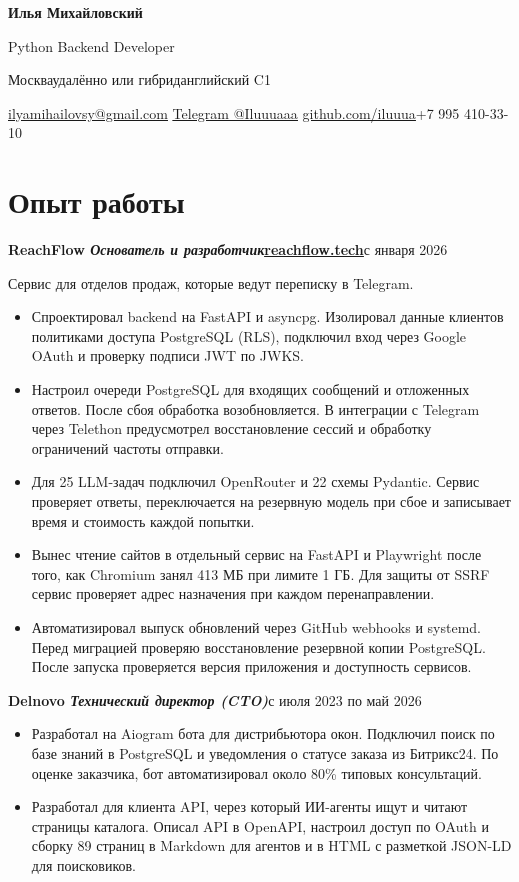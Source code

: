 \documentclass[10pt,a4paper]{article}
\newcommand{\role}[2]{\textbf{#1}\hfill{\small #2}\par}
\newcommand{\sep}{\enspace\textbar\enspace}
\begin{document}
\fontsize{10.3}{12.2}\selectfont
{\centering
  {\fontsize{23}{26}\selectfont\bfseries Илья Михайловский}\par
  \vspace{1.5pt}
  {\large Python Backend Developer}\par
  \vspace{2pt}
  Москва\sep удалённо или гибрид\sep английский C1\par
  \href{mailto:ilyamihailovsy@gmail.com}{\underline{ilyamihailovsy@gmail.com}}\sep
  \href{https://t.me/Iluuuaaa}{\underline{Telegram @Iluuuaaa}}\sep
  \href{https://github.com/iluuua}{\underline{github.com/iluuua}}\sep +7 995 410-33-10\par
}

\section{Опыт работы}
\role{ReachFlow \normalfont\textit{Основатель и разработчик}\enspace\href{https://reachflow.tech}{\underline{reachflow.tech}}}{с января 2026}
Сервис для отделов продаж, которые ведут переписку в Telegram.
\begin{itemize}
  \item Спроектировал backend на FastAPI и asyncpg. Изолировал данные клиентов политиками доступа PostgreSQL (RLS), подключил вход через Google OAuth и проверку подписи JWT по JWKS.
  \item Настроил очереди PostgreSQL для входящих сообщений и отложенных ответов. После сбоя обработка возобновляется. В интеграции с Telegram через Telethon предусмотрел восстановление сессий и обработку ограничений частоты отправки.
  \item Для 25 LLM-задач подключил OpenRouter и 22 схемы Pydantic. Сервис проверяет ответы, переключается на резервную модель при сбое и записывает время и стоимость каждой попытки.
  \item Вынес чтение сайтов в отдельный сервис на FastAPI и Playwright после того, как Chromium занял 413 МБ при лимите 1 ГБ. Для защиты от SSRF сервис проверяет адрес назначения при каждом перенаправлении.
  \item Автоматизировал выпуск обновлений через GitHub webhooks и systemd. Перед миграцией проверяю восстановление резервной копии PostgreSQL. После запуска проверяется версия приложения и доступность сервисов.
\end{itemize}

\vspace{3pt}
\role{Delnovo \normalfont\textit{Технический директор (CTO)}}{с июля 2023 по май 2026}
\begin{itemize}
  \item Разработал на Aiogram бота для дистрибьютора окон. Подключил поиск по базе знаний в PostgreSQL и уведомления о статусе заказа из Битрикс24. По оценке заказчика, бот автоматизировал около 80\% типовых консультаций.
  \item Разработал для клиента API, через который ИИ-агенты ищут и читают страницы каталога. Описал API в OpenAPI, настроил доступ по OAuth и сборку 89 страниц в Markdown для агентов и в HTML с разметкой JSON-LD для поисковиков.
\end{itemize}
\end{document}
